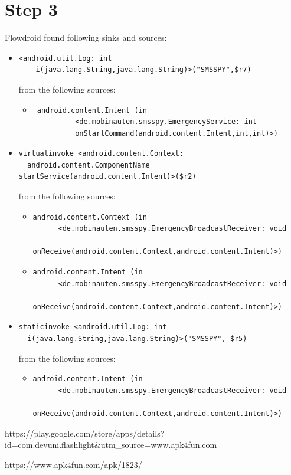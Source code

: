 \documentclass[10pt,a4paper]{article}
\begin{document}
\section{Step 3}
Flowdroid found following sinks and sources:
\begin{itemize}
  \item \begin{verbatim}<android.util.Log: int
    i(java.lang.String,java.lang.String)>("SMSSPY",$r7)\end{verbatim}
    from the following sources:
    \begin{itemize}
	\item \begin{verbatim} android.content.Intent (in 
          <de.mobinauten.smsspy.EmergencyService: int 
          onStartCommand(android.content.Intent,int,int)>)\end{verbatim}
    \end{itemize}

  \item \begin{verbatim}virtualinvoke <android.content.Context:
  android.content.ComponentName startService(android.content.Intent)>($r2)\end{verbatim}
    from the following sources:
    \begin{itemize}
      \item \begin{verbatim}android.content.Context (in
      <de.mobinauten.smsspy.EmergencyBroadcastReceiver: void
        onReceive(android.content.Context,android.content.Intent)>)\end{verbatim}
      \item  \begin{verbatim}android.content.Intent (in
      <de.mobinauten.smsspy.EmergencyBroadcastReceiver: void
        onReceive(android.content.Context,android.content.Intent)>)\end{verbatim}
    \end{itemize}

  \item \begin{verbatim}staticinvoke <android.util.Log: int
  i(java.lang.String,java.lang.String)>("SMSSPY", $r5)\end{verbatim}
  from the following sources:
    \begin{itemize}
      \item \begin{verbatim}android.content.Intent (in
      <de.mobinauten.smsspy.EmergencyBroadcastReceiver: void
        onReceive(android.content.Context,android.content.Intent)>)\end{verbatim}
    \end{itemize}

\end{itemize}


\begin{thebibliography}{9}
  
  https://play.google.com/store/apps/details?id=com.devuni.flashlight\&utm\_source=www.apk4fun.com

  https://www.apk4fun.com/apk/1823/
\end{thebibliography}
\end{document}
